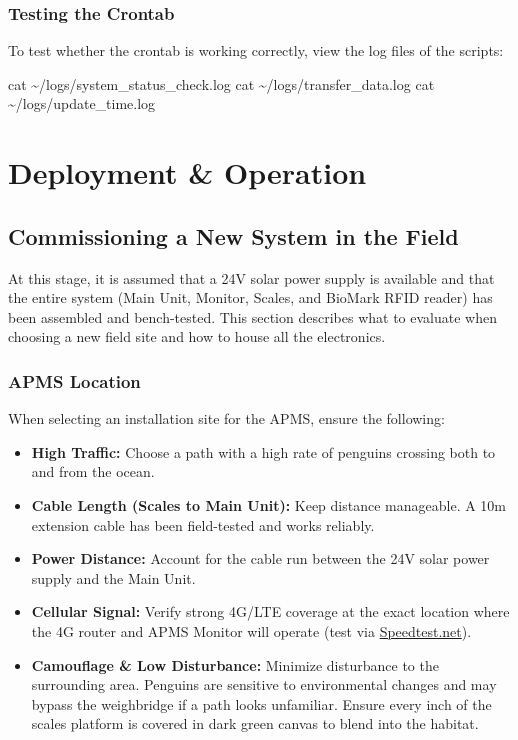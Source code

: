 \documentclass[
  letterpaper,
]{scrbook}
\newenvironment{Shaded}{\begin{snugshade}}{\end{snugshade}}
\newcommand{\FunctionTok}[1]{\textcolor[rgb]{0.28,0.35,0.67}{#1}}
\newcommand{\NormalTok}[1]{\textcolor[rgb]{0.00,0.23,0.31}{#1}}
\providecommand{\tightlist}{%
  \setlength{\itemsep}{0pt}\setlength{\parskip}{0pt}}
\begin{document}
\section{Testing the Crontab}\label{testing-the-crontab}

To test whether the crontab is working correctly, view the log files of
the scripts:

\begin{Shaded}
\begin{Highlighting}[]
\FunctionTok{cat}\NormalTok{ \textasciitilde{}/logs/system\_status\_check.log}
\FunctionTok{cat}\NormalTok{ \textasciitilde{}/logs/transfer\_data.log}
\FunctionTok{cat}\NormalTok{ \textasciitilde{}/logs/update\_time.log}
\end{Highlighting}
\end{Shaded}

\part{Deployment \& Operation}

\chapter{Commissioning a New System in the
Field}\label{commissioning-a-new-system-in-the-field}

At this stage, it is assumed that a 24V solar power supply is available
and that the entire system (Main Unit, Monitor, Scales, and BioMark RFID
reader) has been assembled and bench-tested. This section describes what
to evaluate when choosing a new field site and how to house all the
electronics.

\section{APMS Location}\label{apms-location}

When selecting an installation site for the APMS, ensure the following:

\begin{itemize}
\tightlist
\item
  \textbf{High Traffic:} Choose a path with a high rate of penguins
  crossing both to and from the ocean.
\item
  \textbf{Cable Length (Scales to Main Unit):} Keep distance manageable.
  A 10m extension cable has been field-tested and works reliably.
\item
  \textbf{Power Distance:} Account for the cable run between the 24V
  solar power supply and the Main Unit.
\item
  \textbf{Cellular Signal:} Verify strong 4G/LTE coverage at the exact
  location where the 4G router and APMS Monitor will operate (test via
  \href{https://www.speedtest.net}{Speedtest.net}).
\item
  \textbf{Camouflage \& Low Disturbance:} Minimize disturbance to the
  surrounding area. Penguins are sensitive to environmental changes and
  may bypass the weighbridge if a path looks unfamiliar. Ensure every
  inch of the scales platform is covered in dark green canvas to blend
  into the habitat.
\end{itemize}
\end{document}
